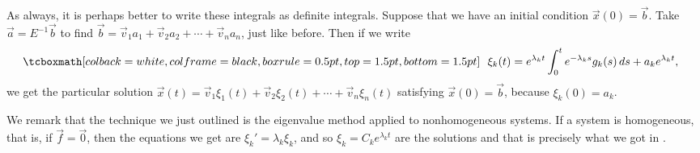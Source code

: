 \medskip

As always,
it is perhaps better to write these integrals as definite integrals.  
Suppose that we have an initial condition $\vec{x}(0) = \vec{b}$.
Take $\vec{a} = E^{-1} \vec{b}$ to find
$\vec{b} = \vec{v}_1 a_1 + \vec{v}_2 a_2 + \cdots + \vec{v}_n a_n$,
just like before.
Then if we write 
\begin{equation*}
\mybxbg{~~
\xi_k(t) =  e^{\lambda_k t} 
\int_0^t e^{-\lambda_k s} g_k(s) \,ds + a_k e^{\lambda_k t} ,
~~}
\end{equation*}
we get the particular solution
$\vec{x}(t) =
\vec{v}_1 \xi_1(t) + 
\vec{v}_2 \xi_2(t) + \cdots +
\vec{v}_n \xi_n(t)$ satisfying $\vec{x}(0) = \vec{b}$,
because $\xi_k(0) = a_k$.

We remark that the technique we just outlined is the eigenvalue
method applied to nonhomogeneous systems.  If a system is homogeneous, that
is, if $\vec{f}=\vec{0}$, then the equations we get are
$\xi_k' = \lambda_k \xi_k$, and so $\xi_k = C_k e^{\lambda_k t}$ are the
solutions and that is precisely what we got in
.

